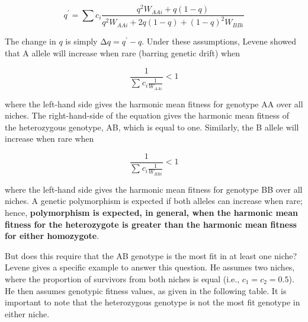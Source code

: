 \documentclass[
  letterpaper,
]{book}
\begin{document}
\[q^{'} = \sum_{}^{}c_{i}\frac{q^{2}W_{AAi} + q(1 - q)}{q^{2}W_{AAi} + 2q(1 - q) + (1 - q)^{2}W_{BBi}}\]

The change in \(q\) is simply \(\mathrm{\Delta}q = q^{'} - q\). Under
these assumptions, Levene showed that A allele will increase when rare
(barring genetic drift) when \textbar{}

\[\frac{1}{\sum_{}^{}{c_{i}\frac{1}{W_{AAi}}}} < 1\]

where the left-hand side gives the harmonic mean fitness for genotype AA
over all niches. The right-hand-side of the equation gives the harmonic
mean fitness of the heterozygous genotype, AB, which is equal to one.
Similarly, the B allele will increase when rare when

\[\frac{1}{\sum_{}^{}{c_{i}\frac{1}{W_{BBi}}}} < 1\]

where the left-hand side gives the harmonic mean fitness for genotype BB
over all niches. A genetic polymorphism is expected if both alleles can
increase when rare; hence, \textbf{polymorphism is expected, in general,
when the harmonic mean fitness for the heterozygote is greater than the
harmonic mean fitness for either homozygote}.

But does this require that the AB genotype is the most fit in at least
one niche? Levene gives a specific example to answer this question. He
assumes two niches, where the proportion of survivors from both niches
is equal (i.e., \(c_{1} = c_{2} = 0.5\)). He then assumes genotypic
fitness values, as given in the following table. It is important to note
that the heterozygous genotype is not the most fit genotype in either
niche.
\end{document}
